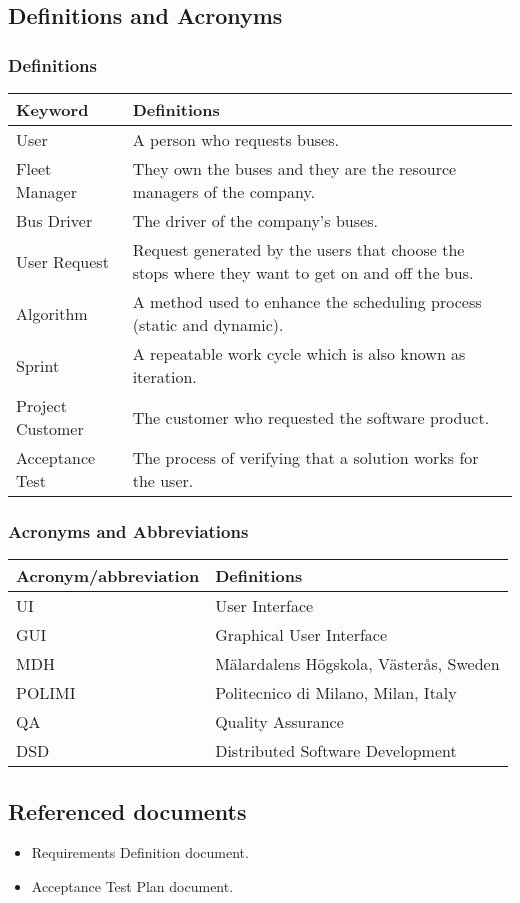 \subsection{Definitions and Acronyms}

\subsubsection{Definitions}
\begin{center}
	\begin{tabular} { | m{3.5cm} | m{9.5cm} | }
		\hline
		\textbf{Keyword} & \textbf{Definitions}\\
		\hline
		User & A person who requests buses.\\
		\hline
		Fleet Manager & They own the buses and they are the resource managers of the company.\\
		\hline
		Bus Driver & The driver of the company's buses.\\
		\hline
		User Request & Request generated by the users that choose the stops where they want to get on and off the bus.\\
		\hline
		Algorithm & A method used to enhance the scheduling process (static and dynamic).\\
		\hline
		Sprint & A repeatable work cycle which is also known as iteration.\\
		\hline
		Project Customer & The customer who requested the software product.\\
		\hline
		Acceptance Test & The process of verifying that a solution works for the user.\\
		\hline
	\end{tabular}
\end{center}
\subsubsection{Acronyms and Abbreviations}
\begin{center}
	\begin{tabular} { | m{5cm} | m{8cm} | }
		\hline
		\textbf{Acronym/abbreviation} & \textbf{Definitions}\\
		\hline
		UI & User Interface\\
		\hline
		GUI & Graphical User Interface\\
		\hline
		MDH & M\"{a}lardalens H\"{o}gskola, V\"{a}ster\r{a}s, Sweden\\
		\hline
		POLIMI & Politecnico di Milano, Milan, Italy\\
		\hline
		QA & Quality Assurance\\
		\hline
		DSD & Distributed Software Development\\
		\hline
	\end{tabular}
\end{center}

\subsection{Referenced documents}
\begin{itemize}
	\item Requirements Definition document.
	\item Acceptance Test Plan document.
\end{itemize}